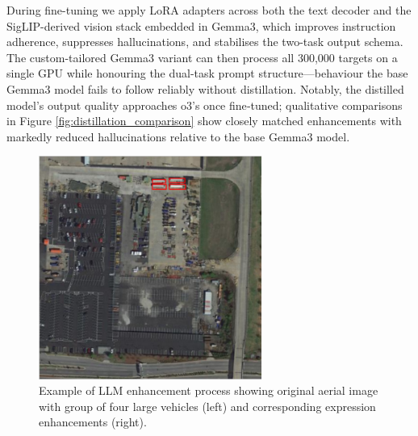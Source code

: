 During fine-tuning we apply LoRA adapters across both the text decoder and the SigLIP-derived vision stack embedded in Gemma3, which improves instruction adherence, suppresses hallucinations, and stabilises the two-task output schema. The custom-tailored Gemma3 variant can then process all 300,000 targets on a single GPU while honouring the dual-task prompt structure—behaviour the base Gemma3 model fails to follow reliably without distillation. Notably, the distilled model’s output quality approaches o3’s once fine‑tuned; qualitative comparisons in Figure \ref{fig:distillation_comparison} show closely matched enhancements with markedly reduced hallucinations relative to the base Gemma3 model.

\begin{figure}[t]
\centering
\begin{minipage}{0.5\textwidth}
\centering
\includegraphics[width=0.65\textwidth]{./images/example_group.png}
\end{minipage}%
\begin{minipage}{0.5\textwidth}
\centering
\hspace{-1cm}
\end{minipage}
\caption{Example of LLM enhancement process showing original aerial image with group of four large vehicles (left) and corresponding expression enhancements (right).}
\label{fig:llm_enhancement_example}
\end{figure}


